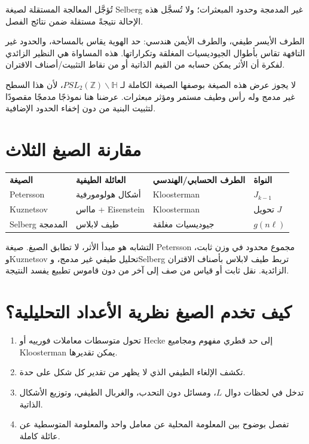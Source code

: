 \begin{remark}
تُؤجَّل المعالجة المستقلة لصيغة Selberg غير المدمجة وحدود المبعثرات؛
ولا تُسجَّل هذه الإحالة نتيجةً مستقلة ضمن نتائج الفصل.
\end{remark}

الطرف الأيسر طيفي، والطرف الأيمن هندسي: حد الهوية يقاس بالمساحة،
والحدود غير التافهة تقاس بأطوال الجيوديسيات المغلقة وتكراراتها. هذه
المساواة هي النظير الزائدي لفكرة أن الأثر يمكن حسابه من القيم الذاتية
أو من نقاط التثبيت/أصناف الاقتران.

\begin{remark}
لا يجوز عرض هذه الصيغة بوصفها الصيغة الكاملة لـ
\(PSL_2(\mathbb Z)\backslash\mathbb H\)، لأن هذا السطح غير مدمج وله
رأس وطيف مستمر ومؤثر مبعثرات. عرضنا هنا نموذجًا مدمجًا مقصودًا لتثبيت
البنية من دون إخفاء الحدود الإضافية.
\end{remark}

\section{مقارنة الصيغ الثلاث}

\begin{center}
\begin{tabular}{llll}
\textbf{الصيغة} & \textbf{العائلة الطيفية} & \textbf{الطرف الحسابي/الهندسي}
& \textbf{النواة}\\
Petersson & أشكال هولومورفية & Kloosterman & \(J_{k-1}\)\\
Kuznetsov & مااس + Eisenstein & Kloosterman & تحويل \(J\)\\
Selberg المدمجة & طيف لابلاس & جيوديسيات مغلقة & \(g(n\ell)\)
\end{tabular}
\end{center}

التشابه هو مبدأ الأثر، لا تطابق الصيغ. صيغة Petersson مجموع محدود في
وزن ثابت، وKuznetsov تحليل طيفي غير مدمج، وSelberg تربط طيف لابلاس
بأصناف الاقتران الزائدية. نقل ثابت أو قياس من صف إلى آخر من دون قاموس
تطبيع يفسد النتيجة.

\section{كيف تخدم الصيغ نظرية الأعداد التحليلية؟}

\begin{enumerate}
  \item تحول متوسطات معاملات فورييه أو Hecke إلى حد قطري مفهوم ومجاميع
  Kloosterman يمكن تقديرها.
  \item تكشف الإلغاء الطيفي الذي لا يظهر من تقدير كل شكل على حدة.
  \item تدخل في لحظات دوال \(L\)، ومسائل دون التحدب، والغربال الطيفي،
  وتوزيع الأشكال الذاتية.
  \item تفصل بوضوح بين المعلومة المحلية عن معامل واحد والمعلومة
  المتوسطية عن عائلة كاملة.
\end{enumerate}

